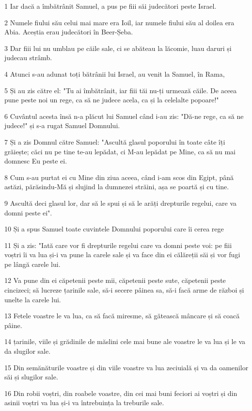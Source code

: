 \par 1 Iar dacă a îmbătrânit Samuel, a pus pe fiii săi judecători peste Israel.
\par 2 Numele fiului său celui mai mare era Ioil, iar numele fiului său al doilea era Abia. Aceștia erau judecători în Beer-Șeba.
\par 3 Dar fiii lui nu umblau pe căile sale, ci se abăteau la lăcomie, luau daruri și judecau strâmb.
\par 4 Atunci s-au adunat toți bătrânii lui Israel, au venit la Samuel, în Rama,
\par 5 Și au zis către el: "Tu ai îmbătrânit, iar fiii tăi nu-ți urmează căile. De aceea pune peste noi un rege, ca să ne judece acela, ca și la celelalte popoare!"
\par 6 Cuvântul acesta însă n-a plăcut lui Samuel când i-au zis: "Dă-ne rege, ca să ne judece!" și s-a rugat Samuel Domnului.
\par 7 Și a zis Domnul către Samuel: "Ascultă glasul poporului în toate câte îți grăiește; căci nu pe tine te-au lepădat, ci M-au lepădat pe Mine, ca să nu mai domnesc Eu peste ei.
\par 8 Cum s-au purtat ei cu Mine din ziua aceea, când i-am scos din Egipt, până astăzi, părăsindu-Mă și slujind la dumnezei străini, așa se poartă și cu tine.
\par 9 Ascultă deci glasul lor, dar să le spui și să le arăți drepturile regelui, care va domni peste ei".
\par 10 Și a spus Samuel toate cuvintele Domnului poporului care îi cerea rege
\par 11 Și a zis: "Iată care vor fi drepturile regelui care va domni peste voi: pe fiii voștri îi va lua și-i va pune la carele sale și va face din ei călăreții săi și vor fugi pe lângă carele lui.
\par 12 Va pune din ei căpetenii peste mii, căpetenii peste sute, căpetenii peste cincizeci; să lucreze țarinile sale, să-i secere pâinea sa, să-i facă arme de război și unelte la carele lui.
\par 13 Fetele voastre le va lua, ca să facă miresme, să gătească mâncare și să coacă pâine.
\par 14 țarinile, viile și grădinile de măslini cele mai bune ale voastre le va lua și le va da slugilor sale.
\par 15 Din semănăturile voastre și din viile voastre va lua zeciuială și va da oamenilor săi și slugilor sale.
\par 16 Din robii voștri, din roabele voastre, din cei mai buni feciori ai voștri și din asinii voștri va lua și-i va întrebuința la treburile sale.
